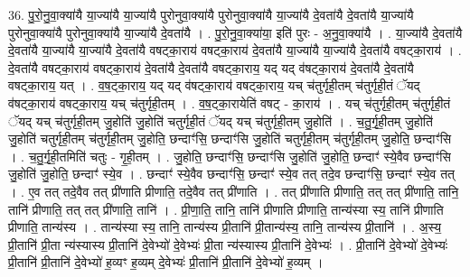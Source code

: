 \documentclass[17pt]{extarticle}
\begin{document}
36. पु॒रो॒नु॒वा॒क्या॑यै या॒ज्या॑यै या॒ज्या॑यै पुरोनुवा॒क्या॑यै पुरोनुवा॒क्या॑यै या॒ज्या॑यै दे॒वता॑यै दे॒वता॑यै या॒ज्या॑यै पुरोनुवा॒क्या॑यै पुरोनुवा॒क्या॑यै या॒ज्या॑यै दे॒वता॑यै । . पु॒रो॒नु॒वा॒क्या॑या॒ इति॑ पुरः - अ॒नु॒वा॒क्या॑यै । . या॒ज्या॑यै दे॒वता॑यै दे॒वता॑यै या॒ज्या॑यै या॒ज्या॑यै दे॒वता॑यै वषट्का॒राय॑ वषट्का॒राय॑ दे॒वता॑यै या॒ज्या॑यै या॒ज्या॑यै दे॒वता॑यै वषट्का॒राय॑ । . दे॒वता॑यै वषट्का॒राय॑ वषट्का॒राय॑ दे॒वता॑यै दे॒वता॑यै वषट्का॒राय॒ यद् यद् व॑षट्का॒राय॑ दे॒वता॑यै दे॒वता॑यै वषट्का॒राय॒ यत् । . व॒ष॒ट्का॒राय॒ यद् यद् व॑षट्का॒राय॑ वषट्का॒राय॒ यच् च॑तुर्गृही॒तम् च॑तुर्गृही॒तं ॅयद् व॑षट्का॒राय॑ वषट्का॒राय॒ यच् च॑तुर्गृही॒तम् । . व॒ष॒ट्का॒रायेति॑ वषट् - का॒राय॑ । . यच् च॑तुर्गृही॒तम् च॑तुर्गृही॒तं ॅयद् यच् च॑तुर्गृही॒तम् जु॒होति॑ जु॒होति॑ चतुर्गृही॒तं ॅयद् यच् च॑तुर्गृही॒तम् जु॒होति॑ । . च॒तु॒र्गृ॒ही॒तम् जु॒होति॑ जु॒होति॑ चतुर्गृही॒तम् च॑तुर्गृही॒तम् जु॒होति॒ छन्दाꣳ॑सि॒ छन्दाꣳ॑सि जु॒होति॑ चतुर्गृही॒तम् च॑तुर्गृही॒तम् जु॒होति॒ छन्दाꣳ॑सि । . च॒तु॒र्गृ॒ही॒तमिति॑ चतुः - गृ॒ही॒तम् । . जु॒होति॒ छन्दाꣳ॑सि॒ छन्दाꣳ॑सि जु॒होति॑ जु॒होति॒ छन्दाꣳ॑ स्ये॒वैव छन्दाꣳ॑सि जु॒होति॑ जु॒होति॒ छन्दाꣳ॑ स्ये॒व । . छन्दाꣳ॑ स्ये॒वैव छन्दाꣳ॑सि॒ छन्दाꣳ॑ स्ये॒व तत् तदे॒व छन्दाꣳ॑सि॒ छन्दाꣳ॑ स्ये॒व तत् । . ए॒व तत् तदे॒वैव तत् प्री॑णाति प्रीणाति॒ तदे॒वैव तत् प्री॑णाति । . तत् प्री॑णाति प्रीणाति॒ तत् तत् प्री॑णाति॒ तानि॒ तानि॑ प्रीणाति॒ तत् तत् प्री॑णाति॒ तानि॑ । . प्री॒णा॒ति॒ तानि॒ तानि॑ प्रीणाति प्रीणाति॒ तान्य॑स्या स्य॒ तानि॑ प्रीणाति प्रीणाति॒ तान्य॑स्य । . तान्य॑स्या स्य॒ तानि॒ तान्य॑स्य प्री॒तानि॑ प्री॒तान्य॑स्य॒ तानि॒ तान्य॑स्य प्री॒तानि॑ । . अ॒स्य॒ प्री॒तानि॑ प्री॒ता न्य॑स्यास्य प्री॒तानि॑ दे॒वेभ्यो॑ दे॒वेभ्यः॑ प्री॒ता न्य॑स्यास्य प्री॒तानि॑ दे॒वेभ्यः॑ । . प्री॒तानि॑ दे॒वेभ्यो॑ दे॒वेभ्यः॑ प्री॒तानि॑ प्री॒तानि॑ दे॒वेभ्यो॑ ह॒व्यꣳ ह॒व्यम् दे॒वेभ्यः॑ प्री॒तानि॑ प्री॒तानि॑ दे॒वेभ्यो॑ ह॒व्यम् । \newline
\end{document}
